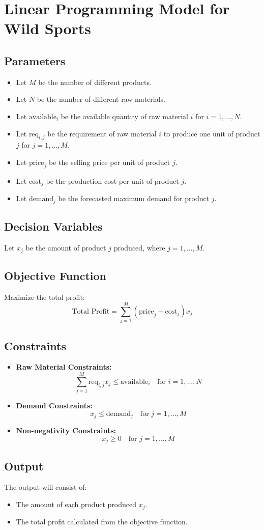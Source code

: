 \documentclass{article}
\begin{document}
\section*{Linear Programming Model for Wild Sports}

\subsection*{Parameters}
\begin{itemize}
    \item Let \( M \) be the number of different products.
    \item Let \( N \) be the number of different raw materials.
    \item Let \( \text{available}_{i} \) be the available quantity of raw material \( i \) for \( i = 1, \ldots, N \).
    \item Let \( \text{req}_{i,j} \) be the requirement of raw material \( i \) to produce one unit of product \( j \) for \( j = 1, \ldots, M \).
    \item Let \( \text{price}_{j} \) be the selling price per unit of product \( j \).
    \item Let \( \text{cost}_{j} \) be the production cost per unit of product \( j \).
    \item Let \( \text{demand}_{j} \) be the forecasted maximum demand for product \( j \).
\end{itemize}

\subsection*{Decision Variables}
Let \( x_j \) be the amount of product \( j \) produced, where \( j = 1, \ldots, M \).

\subsection*{Objective Function}
Maximize the total profit:
\[
\text{Total Profit} = \sum_{j=1}^{M} ( \text{price}_{j} - \text{cost}_{j} ) x_j
\]

\subsection*{Constraints}
\begin{itemize}
    \item \textbf{Raw Material Constraints:} 
    \[
    \sum_{j=1}^{M} \text{req}_{i,j} x_j \leq \text{available}_{i} \quad \text{for } i = 1, \ldots, N
    \]

    \item \textbf{Demand Constraints:} 
    \[
    x_j \leq \text{demand}_{j} \quad \text{for } j = 1, \ldots, M
    \]

    \item \textbf{Non-negativity Constraints:} 
    \[
    x_j \geq 0 \quad \text{for } j = 1, \ldots, M
    \]
\end{itemize}

\subsection*{Output}
The output will consist of:
\begin{itemize}
    \item The amount of each product produced \( x_j \).
    \item The total profit calculated from the objective function.
\end{itemize}
\end{document}

